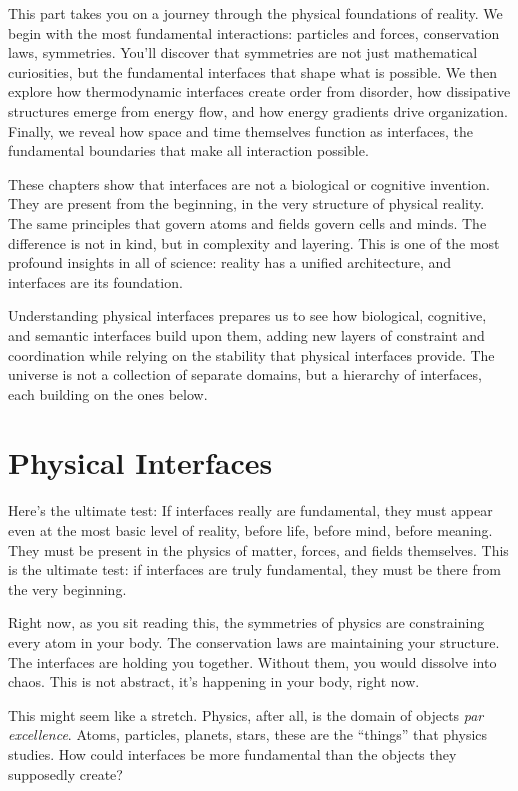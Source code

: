 \documentclass[
  openright]{book}
\begin{document}
This part takes you on a journey through the physical foundations of
reality. We begin with the most fundamental interactions: particles and
forces, conservation laws, symmetries. You'll discover that symmetries
are not just mathematical curiosities, but the fundamental interfaces
that shape what is possible. We then explore how thermodynamic
interfaces create order from disorder, how dissipative structures emerge
from energy flow, and how energy gradients drive organization. Finally,
we reveal how space and time themselves function as interfaces, the
fundamental boundaries that make all interaction possible.

These chapters show that interfaces are not a biological or cognitive
invention. They are present from the beginning, in the very structure of
physical reality. The same principles that govern atoms and fields
govern cells and minds. The difference is not in kind, but in complexity
and layering. This is one of the most profound insights in all of
science: reality has a unified architecture, and interfaces are its
foundation.

Understanding physical interfaces prepares us to see how biological,
cognitive, and semantic interfaces build upon them, adding new layers of
constraint and coordination while relying on the stability that physical
interfaces provide. The universe is not a collection of separate
domains, but a hierarchy of interfaces, each building on the ones below.

\chapter{\texorpdfstring{Physical
Interfaces}{Physical Interfaces}}\label{physical-interfaces}

Here's the ultimate test: If interfaces really are fundamental, they
must appear even at the most basic level of reality, before life, before
mind, before meaning. They must be present in the physics of matter,
forces, and fields themselves. This is the ultimate test: if interfaces
are truly fundamental, they must be there from the very beginning.

Right now, as you sit reading this, the symmetries of physics are
constraining every atom in your body. The conservation laws are
maintaining your structure. The interfaces are holding you together.
Without them, you would dissolve into chaos. This is not abstract, it's
happening in your body, right now.

This might seem like a stretch. Physics, after all, is the domain of
objects \emph{par excellence}. Atoms, particles,
planets, stars, these are the ``things'' that physics studies. How could
interfaces be more fundamental than the objects they supposedly create?
\end{document}

